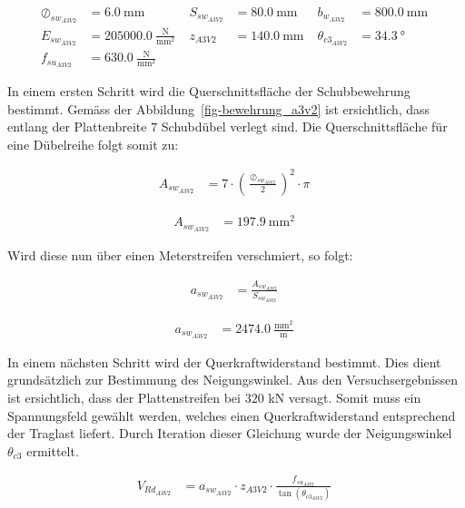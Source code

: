 \documentclass[
  11pt,
  letterpaper,
]{scrreprt}
\begin{document}
$$
\begin{aligned}
\oslash_{sw_{A3V2}} &= 6.0\ \mathrm{mm} \; 
 &S_{sw_{A3V2}} &= 80.0\ \mathrm{mm} \; 
 &b_{w_{A3V2}} &= 800.0\ \mathrm{mm} \; 
\\[12pt]
 E_{sw_{A3V2}} &= 205000.0\ \frac{\mathrm{N}}{\mathrm{mm}^{2}} \; 
 &z_{A3V2} &= 140.0\ \mathrm{mm} \; 
 &\theta_{c3_{A3V2}} &= 34.3\ \mathrm{°} \; 
\\[12pt]
 f_{su_{A3V2}} &= 630.0\ \frac{\mathrm{N}}{\mathrm{mm}^{2}} \;
\end{aligned}
$$

In einem ersten Schritt wird die Querschnittsfläche der Schubbewehrung
bestimmt. Gemäss der Abbildung~\ref{fig-bewehrung_a3v2} ist ersichtlich,
dass entlang der Plattenbreite \(7\) Schubdübel verlegt sind. Die
Querschnittsfläche für eine Dübelreihe folgt somit zu:

$$
\begin{aligned}
A_{sw_{A3V2}} &= 7 \cdot \left( \frac{ \oslash_{sw_{A3V2}} }{ 2 } \right) ^{ 2 } \cdot \pi \; 
\end{aligned}
$$

$$
\begin{aligned}
A_{sw_{A3V2}} &= 197.9\ \mathrm{mm}^{2} \;
\end{aligned}
$$

Wird diese nun über einen Meterstreifen verschmiert, so folgt:

$$
\begin{aligned}
a_{sw_{A3V2}} &= \frac{ A_{sw_{A3V2}} }{ S_{sw_{A3V2}} } \; 
\end{aligned}
$$

$$
\begin{aligned}
a_{sw_{A3V2}} &= 2474.0\ \frac{\mathrm{mm}^{2}}{\mathrm{m}} \;
\end{aligned}
$$

In einem nächsten Schritt wird der Querkraftwiderstand bestimmt. Dies
dient grundsätzlich zur Bestimmung des Neigungswinkel. Aus den
Versuchsergebnissen ist ersichtlich, dass der Plattenstreifen bei
\(320\) kN versagt. Somit muss ein Spannungsfeld gewählt werden, welches
einen Querkraftwiderstand entsprechend der Traglast liefert. Durch
Iteration dieser Gleichung wurde der Neigungswinkel \(\theta_{c3}\)
ermittelt.

$$
\begin{aligned}
V_{Rd_{A3V2}} &= a_{sw_{A3V2}} \cdot z_{A3V2} \cdot \frac{ f_{su_{A3V2}} }{ \tan \left( \theta_{c3_{A3V2}} \right) } \; 
\end{aligned}
$$
\end{document}
